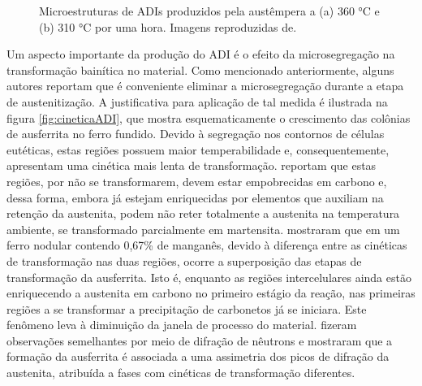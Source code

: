 \begin{figure}
	\quad
	\caption{Microestruturas de ADIs produzidos pela austêmpera a (a) 360 °C e (b) 310 °C por uma hora. Imagens reproduzidas de\cite{Trudel1997}.}
	\label{fig:ADIs}
\end{figure}

Um aspecto importante da produção do ADI é o efeito da microsegregação na transformação bainítica no material. Como mencionado anteriormente, alguns autores reportam que é conveniente eliminar a microsegregação durante a etapa de austenitização. A justificativa para aplicação de tal medida é ilustrada na figura \ref{fig:cineticaADI}, que mostra esquematicamente o crescimento das colônias de ausferrita no ferro fundido. Devido à segregação nos contornos de células eutéticas, estas regiões possuem maior temperabilidade e, consequentemente, apresentam uma cinética mais lenta de transformação.  reportam que estas regiões, por não se transformarem, devem estar empobrecidas em carbono e, dessa forma, embora já estejam enriquecidas por elementos que auxiliam na retenção da austenita, podem não reter totalmente a austenita na temperatura ambiente, se transformado parcialmente em martensita.  mostraram que em um ferro nodular contendo 0,67\% de manganês, devido à diferença entre as cinéticas de transformação nas duas regiões, ocorre a superposição das etapas de transformação da ausferrita. Isto é, enquanto as regiões intercelulares ainda estão enriquecendo a austenita em carbono no primeiro estágio da reação, nas primeiras regiões a se transformar a precipitação de carbonetos já se iniciara. Este fenômeno leva à diminuição da janela de processo do material.  fizeram observações semelhantes por meio de difração de nêutrons  e mostraram que a formação da ausferrita é associada a uma assimetria dos picos de difração da austenita, atribuída a fases com cinéticas de transformação diferentes.


